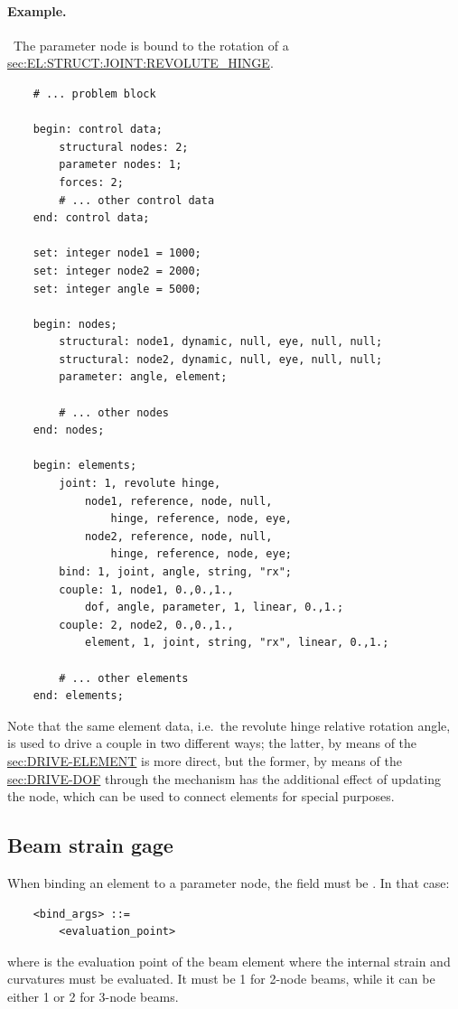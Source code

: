 \paragraph{Example.} \
The parameter node  is bound to the rotation of a 
\hyperref{\kw{revolute hinge}}{\kw{revolute hinge} (see Section~}{)}{sec:EL:STRUCT:JOINT:REVOLUTE_HINGE}.
\begin{verbatim}
    # ... problem block

    begin: control data;
        structural nodes: 2;
        parameter nodes: 1;
        forces: 2;
        # ... other control data
    end: control data;

    set: integer node1 = 1000;
    set: integer node2 = 2000;
    set: integer angle = 5000;

    begin: nodes;
        structural: node1, dynamic, null, eye, null, null;
        structural: node2, dynamic, null, eye, null, null;
        parameter: angle, element;

        # ... other nodes
    end: nodes;

    begin: elements;
        joint: 1, revolute hinge,
            node1, reference, node, null,
                hinge, reference, node, eye,
            node2, reference, node, null,
                hinge, reference, node, eye;
        bind: 1, joint, angle, string, "rx";
        couple: 1, node1, 0.,0.,1.,
            dof, angle, parameter, 1, linear, 0.,1.;
        couple: 2, node2, 0.,0.,1.,
            element, 1, joint, string, "rx", linear, 0.,1.;

        # ... other elements
    end: elements;
\end{verbatim}
Note that the same element data, i.e.\ the revolute hinge
relative rotation angle, is used to drive a couple in two different
ways; the latter, by means of the 
\hyperref{\kw{element} drive}{\kw{element} drive (see Section~}{)}{sec:DRIVE-ELEMENT}
is more direct, but the former, by means of the 
\hyperref{\kw{dof} drive}{\kw{dof} drive (see Section~}{)}{sec:DRIVE-DOF}
through the \kw{bind} mechanism has the additional effect of updating
the \kw{parameter} node, which can be used to connect
 elements for special purposes.

\subsection{Beam strain gage}
When binding an element to a
parameter node, the \kw{element\_type} field must be \kw{beam}.
In that case:
\begin{verbatim}
    <bind_args> ::=
        <evaluation_point>
\end{verbatim}
where  is the evaluation point of the beam element
where the internal strain and curvatures must be evaluated.
It must be 1 for 2-node beams, while it can be either 1 or 2
for 3-node beams.

